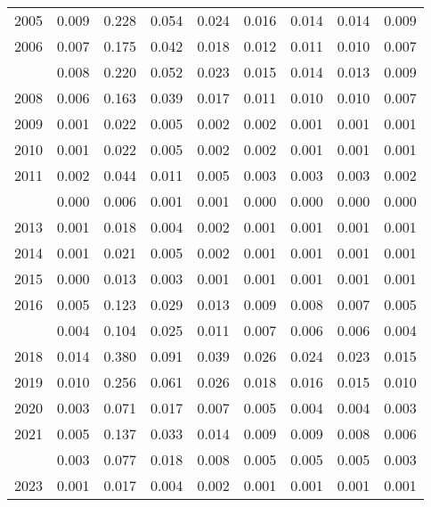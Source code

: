 \documentclass[
]{article}
\begin{document}
\begin{longtable}[t]{lrrrrrrrr}
2005 & 0.009 & 0.228 & 0.054 & 0.024 & 0.016 & 0.014 & 0.014 & 0.009\\
2006 & 0.007 & 0.175 & 0.042 & 0.018 & 0.012 & 0.011 & 0.010 & 0.007\\
\addlinespace
2007 & 0.008 & 0.220 & 0.052 & 0.023 & 0.015 & 0.014 & 0.013 & 0.009\\
2008 & 0.006 & 0.163 & 0.039 & 0.017 & 0.011 & 0.010 & 0.010 & 0.007\\
2009 & 0.001 & 0.022 & 0.005 & 0.002 & 0.002 & 0.001 & 0.001 & 0.001\\
2010 & 0.001 & 0.022 & 0.005 & 0.002 & 0.002 & 0.001 & 0.001 & 0.001\\
2011 & 0.002 & 0.044 & 0.011 & 0.005 & 0.003 & 0.003 & 0.003 & 0.002\\
\addlinespace
2012 & 0.000 & 0.006 & 0.001 & 0.001 & 0.000 & 0.000 & 0.000 & 0.000\\
2013 & 0.001 & 0.018 & 0.004 & 0.002 & 0.001 & 0.001 & 0.001 & 0.001\\
2014 & 0.001 & 0.021 & 0.005 & 0.002 & 0.001 & 0.001 & 0.001 & 0.001\\
2015 & 0.000 & 0.013 & 0.003 & 0.001 & 0.001 & 0.001 & 0.001 & 0.001\\
2016 & 0.005 & 0.123 & 0.029 & 0.013 & 0.009 & 0.008 & 0.007 & 0.005\\
\addlinespace
2017 & 0.004 & 0.104 & 0.025 & 0.011 & 0.007 & 0.006 & 0.006 & 0.004\\
2018 & 0.014 & 0.380 & 0.091 & 0.039 & 0.026 & 0.024 & 0.023 & 0.015\\
2019 & 0.010 & 0.256 & 0.061 & 0.026 & 0.018 & 0.016 & 0.015 & 0.010\\
2020 & 0.003 & 0.071 & 0.017 & 0.007 & 0.005 & 0.004 & 0.004 & 0.003\\
2021 & 0.005 & 0.137 & 0.033 & 0.014 & 0.009 & 0.009 & 0.008 & 0.006\\
\addlinespace
2022 & 0.003 & 0.077 & 0.018 & 0.008 & 0.005 & 0.005 & 0.005 & 0.003\\
2023 & 0.001 & 0.017 & 0.004 & 0.002 & 0.001 & 0.001 & 0.001 & 0.001\\*
\end{longtable}
\end{document}
